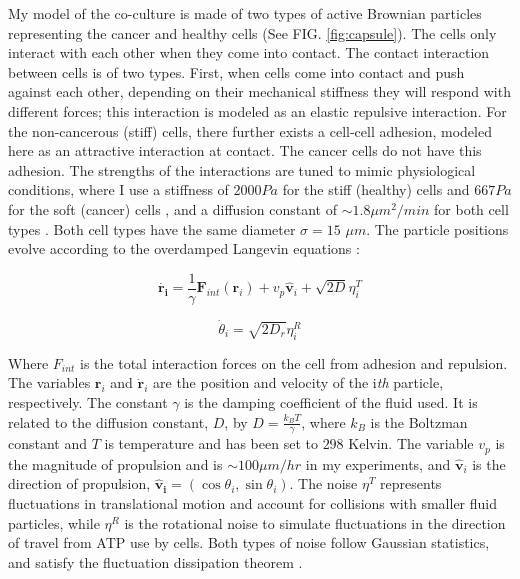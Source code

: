 \documentclass[aps,prb,twocolumn,groupedaddress,nofootinbib,floatfix]{revtex4}
\begin{document}
My model of the co-culture is made of two types of active Brownian particles representing the cancer and healthy cells (See FIG. \ref{fig:capsule}). 
The cells only interact with each other when they come into contact.
The contact interaction between cells is of two types.
First, when cells come into contact and push against each other, depending on their mechanical stiffness they will respond with different forces; this interaction is modeled as an elastic repulsive interaction.
For the non-cancerous (stiff) cells, there further exists a cell-cell adhesion, modeled here as an attractive interaction at contact.
The cancer cells do not have this adhesion.
The strengths of the interactions are tuned to mimic physiological conditions, where I use a stiffness of $2000 Pa$ for the stiff  (healthy) cells and $667 Pa$ for the soft (cancer) cells \cite{Lee},
and a diffusion constant of $\sim 1.8 \mu m^2 /min$ for both cell types \cite{Mingming}.
Both cell types have the same diameter  $\sigma = 15$ $\mu m$.
The particle positions evolve according to the overdamped Langevin equations \cite{Lemons,RednerBaskaran,FilyMarchetti,Butcher}: 

\begin{equation}
  \bm{\dot{\bm{r}_i}} = \frac{1}{\gamma}\bm{F}_{int}(\bm{r}_i) + v_p\hat{\bm{v}}_i+\sqrt{2D}\eta_i^T
\end{equation}

\begin{equation}
  \dot{\theta}_i=\sqrt{2D_r}\eta^R_i
\end{equation}

Where $F_{int}$ is the total interaction forces on the cell from adhesion and repulsion.
The variables $\bm{r}_i$ and $\dot{\bm{r}}_i$ are the position and velocity of the i\textit{th} particle, respectively.
The constant $\gamma$ is the damping coefficient of the fluid used. It is related to the
diffusion constant, $D$, by $D=\frac{k_BT}{\gamma}$, where $k_B$ is the Boltzman constant and $T$ is temperature and has been set to $298$ Kelvin. 
The variable $v_p$ is the magnitude of propulsion and is $\sim 100 \mu m/hr$ in my experiments, and $\bm{\hat{v}}_i$ is the direction of propulsion, $\bm{\hat{v}_i}=(\cos \theta_i, \sin \theta_i)$.
The noise $\eta^T$ represents fluctuations in translational motion and account for collisions with smaller fluid particles, while
$\eta^R$ is the rotational noise to simulate fluctuations in the direction of travel from ATP use by cells. Both types of noise follow Gaussian statistics, and satisfy the fluctuation dissipation theorem \cite{}.
\end{document}
